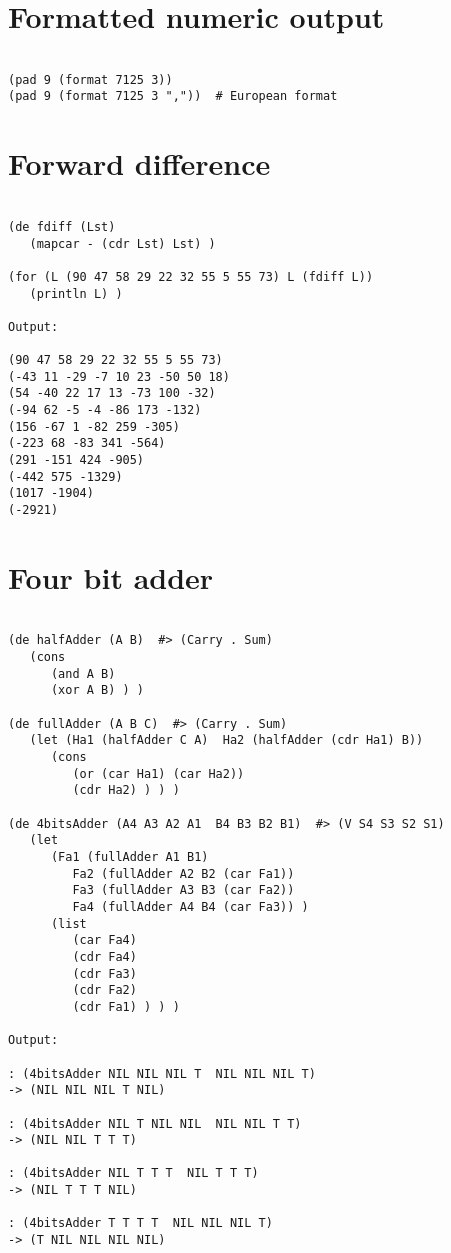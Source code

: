 \section*{Formatted numeric output}

\begin{verbatim}

(pad 9 (format 7125 3))
(pad 9 (format 7125 3 ","))  # European format

\end{verbatim}

\section*{Forward difference}

\begin{verbatim}

(de fdiff (Lst)
   (mapcar - (cdr Lst) Lst) )

(for (L (90 47 58 29 22 32 55 5 55 73) L (fdiff L))
   (println L) )

Output:

(90 47 58 29 22 32 55 5 55 73)
(-43 11 -29 -7 10 23 -50 50 18)
(54 -40 22 17 13 -73 100 -32)
(-94 62 -5 -4 -86 173 -132)
(156 -67 1 -82 259 -305)
(-223 68 -83 341 -564)
(291 -151 424 -905)
(-442 575 -1329)
(1017 -1904)
(-2921)

\end{verbatim}

\section*{Four bit adder}

\begin{verbatim}

(de halfAdder (A B)  #> (Carry . Sum)
   (cons
      (and A B)
      (xor A B) ) )

(de fullAdder (A B C)  #> (Carry . Sum)
   (let (Ha1 (halfAdder C A)  Ha2 (halfAdder (cdr Ha1) B))
      (cons
         (or (car Ha1) (car Ha2))
         (cdr Ha2) ) ) )

(de 4bitsAdder (A4 A3 A2 A1  B4 B3 B2 B1)  #> (V S4 S3 S2 S1)
   (let
      (Fa1 (fullAdder A1 B1)
         Fa2 (fullAdder A2 B2 (car Fa1))
         Fa3 (fullAdder A3 B3 (car Fa2))
         Fa4 (fullAdder A4 B4 (car Fa3)) )
      (list
         (car Fa4)
         (cdr Fa4)
         (cdr Fa3)
         (cdr Fa2)
         (cdr Fa1) ) ) )

Output:

: (4bitsAdder NIL NIL NIL T  NIL NIL NIL T)
-> (NIL NIL NIL T NIL)

: (4bitsAdder NIL T NIL NIL  NIL NIL T T)
-> (NIL NIL T T T)

: (4bitsAdder NIL T T T  NIL T T T)
-> (NIL T T T NIL)

: (4bitsAdder T T T T  NIL NIL NIL T)
-> (T NIL NIL NIL NIL)

\end{verbatim}

